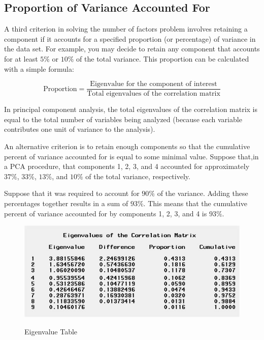 \documentclass[]{article}
\begin{document}
\subsection{Proportion of Variance Accounted For}

A third criterion in solving the number of factors
problem involves retaining a component if it accounts for a specified proportion (or percentage)
of variance in the data set.  For example, you may decide to retain any component that accounts
for at least $5\%$ or $10\%$ of the total variance.  This proportion can be calculated with a simple
formula:

\[ \mbox{Proportion}  = \frac{\mbox{Eigenvalue for the component of interest}}{\mbox{Total eigenvalues of the correlation matrix}}  \]

In principal component analysis, the total eigenvalues of the correlation matrix is equal to the
total number of variables being analyzed (because each variable contributes one unit of variance
to the analysis).

An alternative criterion is to retain enough components so that the cumulative percent of variance
accounted for is equal to some minimal value.  Suppose that,in a PCA procedure, that components 1, 2, 3,
and 4 accounted for approximately $37\%$, $33\%$, $13\%$, and $10\%$ of the total variance, respectively.

Suppose that it was required to account for $90\%$ of the variance. Adding these percentages together results in a sum of $93\%$.  This means that the cumulative percent of variance accounted for by components 1, 2, 3, and 4 is $93\%$.

\begin{figure}[h!]
	\begin{center}
		\includegraphics[scale=0.9]{3AEigen.jpg}\\
		\caption{Eigenvalue Table}\label{Eigenvalue Table}
	\end{center}
	
\end{figure}
\end{document}
